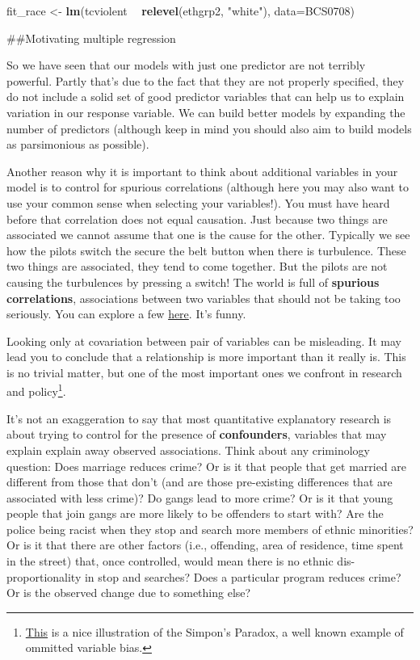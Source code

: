 \documentclass[]{book}
\newenvironment{Shaded}{\begin{snugshade}}{\end{snugshade}}
\newcommand{\DataTypeTok}[1]{\textcolor[rgb]{0.13,0.29,0.53}{#1}}
\newcommand{\KeywordTok}[1]{\textcolor[rgb]{0.13,0.29,0.53}{\textbf{#1}}}
\newcommand{\NormalTok}[1]{#1}
\newcommand{\OperatorTok}[1]{\textcolor[rgb]{0.81,0.36,0.00}{\textbf{#1}}}
\newcommand{\StringTok}[1]{\textcolor[rgb]{0.31,0.60,0.02}{#1}}
\let\rmarkdownfootnote\footnote%
\def\footnote{\protect\rmarkdownfootnote}
\theoremstyle{definition}
\theoremstyle{definition}
\theoremstyle{definition}
\theoremstyle{remark}
\begin{document}
\begin{Shaded}
\begin{Highlighting}[]
\NormalTok{fit_race <-}\StringTok{ }\KeywordTok{lm}\NormalTok{(tcviolent }\OperatorTok{~}\StringTok{ }\KeywordTok{relevel}\NormalTok{(ethgrp2, }\StringTok{"white"}\NormalTok{), }\DataTypeTok{data=}\NormalTok{BCS0708)}
\end{Highlighting}
\end{Shaded}

\#\#Motivating multiple regression

So we have seen that our models with just one predictor are not terribly
powerful. Partly that's due to the fact that they are not properly
specified, they do not include a solid set of good predictor variables
that can help us to explain variation in our response variable. We can
build better models by expanding the number of predictors (although keep
in mind you should also aim to build models as parsimonious as
possible).

Another reason why it is important to think about additional variables
in your model is to control for spurious correlations (although here you
may also want to use your common sense when selecting your variables!).
You must have heard before that correlation does not equal causation.
Just because two things are associated we cannot assume that one is the
cause for the other. Typically we see how the pilots switch the secure
the belt button when there is turbulence. These two things are
associated, they tend to come together. But the pilots are not causing
the turbulences by pressing a switch! The world is full of
\textbf{spurious correlations}, associations between two variables that
should not be taking too seriously. You can explore a few
\href{http://tylervigen.com/}{here}. It's funny.

Looking only at covariation between pair of variables can be misleading.
It may lead you to conclude that a relationship is more important than
it really is. This is no trivial matter, but one of the most important
ones we confront in research and policy\footnote{\href{http://vudlab.com/simpsons/}{This}
  is a nice illustration of the Simpon's Paradox, a well known example
  of ommitted variable bias.}.

It's not an exaggeration to say that most quantitative explanatory
research is about trying to control for the presence of
\textbf{confounders}, variables that may explain explain away observed
associations. Think about any criminology question: Does marriage
reduces crime? Or is it that people that get married are different from
those that don't (and are those pre-existing differences that are
associated with less crime)? Do gangs lead to more crime? Or is it that
young people that join gangs are more likely to be offenders to start
with? Are the police being racist when they stop and search more members
of ethnic minorities? Or is it that there are other factors (i.e.,
offending, area of residence, time spent in the street) that, once
controlled, would mean there is no ethnic dis-proportionality in stop
and searches? Does a particular program reduces crime? Or is the
observed change due to something else?
\end{document}
